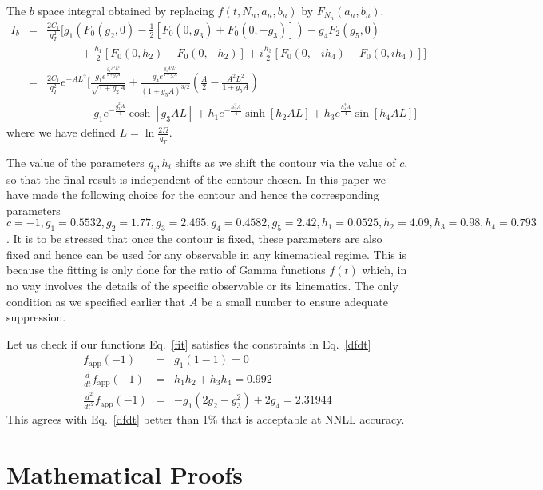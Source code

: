 \documentclass[a4,letterpaper,11pt]{article}
\newcommand{\nn}{\nonumber}
\newcommand{\bea}{\begin{eqnarray}}
\newcommand{\eea}{\end{eqnarray}}
\newcommand{\eq}[1]{Eq.~\eqref{#1}}
\begin{document}
The $b$ space integral obtained by replacing $f(t,N_n, a_n,b_n)$ by $F_{N_n}(a_n,b_n)$.
\bea \label{Ibexplicit}
I_b&=&\frac{2C_1}{q_T^2}  \Bigg[
g_1\left(F_0(g_2,0) -\frac 12 [F_0(0,g_3)+F_0(0,-g_3)]\right) - g_4 F_2(g_5,0)
\nn\\ && \qquad \quad
+ \frac{h_1}{2} \left[ F_0(0,h_2)-F_0(0,-h_2)\right] +i\frac{h_3}{2} \left[ F_0(0,-i h_4)-F_0(0,ih_4)\right] 
\Bigg]
\nn\\
&=&
\frac{2C_1}{q_T^2}  e^{-A L^2}
\Bigg[ \frac{g_1 e^{\frac{g_2 A^2L^2}{1+g_2 A}}}{\sqrt{1+g_2 A}}
+\frac{g_4 e^{\frac{g_5 A^2 L^2}{1+g_5A}}}{(1+g_5 A)^{3/2} }\left( \frac{A}{2}-\frac{A^2L^2}{1+ g_5 A}\right) 
\nn\\ && \qquad\quad
-g_1 e^{-\frac{ g_3^2 A}{4}}\cosh[g_3 AL]+h_1e^{-\frac{ h_2^2 A}{4}}\sinh[ h_2 A L]+h_3e^{\frac{ h_4^2 A}{4}} \sin[h_4 A L ]  \Bigg]
\eea
where we have defined $L= \ln \tfrac{2 \Omega}{q_T}$.

The value of the parameters $ g_i, h_i$ shifts as we shift the contour via the value of $c$, so that the final result is independent of the contour chosen. In this paper we have made the following choice for the contour and hence the corresponding parameters $c= -1, g_1=0.5532, g_2=1.77, g_3=2.465, g_4=0.4582, g_5=2.42, h_1 =0.0525, h_2 =4.09, h_3= 0.98, h_4= 0.793$. It is to be stressed that once the contour is fixed, these parameters are also fixed and hence can be used for any observable in any kinematical regime. This is because the fitting is only done for the ratio of Gamma functions $f(t)$ which, in no way involves the details of the specific observable or its kinematics. The only condition as we specified earlier that $A$ be a small number to ensure adequate suppression.  

Let us check if our functions \eq{fit} satisfies the constraints in \eq{dfdt}
\bea
f_\text{app}(-1) &=& g_1(1-1) =0
\nn \\
\frac{d}{dt} f_\text{app}(-1) &=& h_1h_2+h_3 h_4  =0.992
\nn \\
\frac{d^2}{dt^2} f_\text{app}(-1) &=& -g_1 (2 g_2 - g_3^2) + 2 g_4  = 2.31944
\eea
This agrees with \eq{dfdt} better than 1\% that is acceptable at NNLL accuracy.


\section{Mathematical Proofs}

\end{document}
